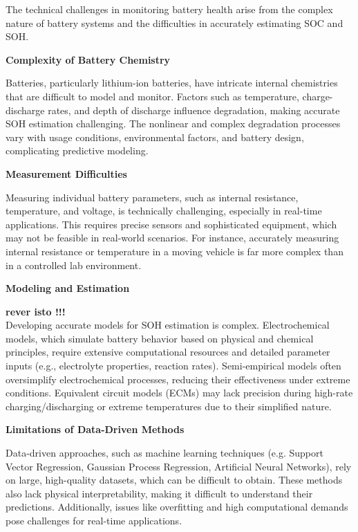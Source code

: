 The technical challenges in monitoring battery health arise from the complex nature of battery systems and the difficulties in accurately estimating SOC and SOH.
\vspace{1cm}

\textbf{Complexity of Battery Chemistry}

Batteries, particularly lithium-ion batteries, have intricate internal chemistries that are difficult to model and monitor.
Factors such as temperature, charge-discharge rates, and depth of discharge influence degradation, making accurate SOH estimation challenging. 
The nonlinear and complex degradation processes vary with usage conditions, environmental factors, and battery design, complicating predictive modeling.
\vspace{1cm}

\textbf{Measurement Difficulties}

Measuring individual battery parameters, such as internal resistance, temperature, and voltage, is technically challenging, especially in real-time applications. 
This requires precise sensors and sophisticated equipment, which may not be feasible in real-world scenarios. 
For instance, accurately measuring internal resistance or temperature in a moving vehicle is far more complex than in a controlled lab environment.
\vspace{1cm}

\textbf{Modeling and Estimation}

\textbf{rever isto !!!} \\
Developing accurate models for SOH estimation is complex. 
Electrochemical models, which simulate battery behavior based on physical and chemical principles, require extensive computational resources and detailed parameter inputs (e.g., electrolyte properties, reaction rates). 
Semi-empirical models often oversimplify electrochemical processes, reducing their effectiveness under extreme conditions. Equivalent circuit models (ECMs) may lack precision during high-rate charging/discharging or extreme temperatures due to their simplified nature.
\vspace{1cm}

\textbf{Limitations of Data-Driven Methods}

Data-driven approaches, such as machine learning techniques (e.g. Support Vector Regression, Gaussian Process Regression, Artificial Neural Networks), rely on large, high-quality datasets, which can be difficult to obtain. 
These methods also lack physical interpretability, making it difficult to understand their predictions. 
Additionally, issues like overfitting and high computational demands pose challenges for real-time applications.
\vspace{1cm}

